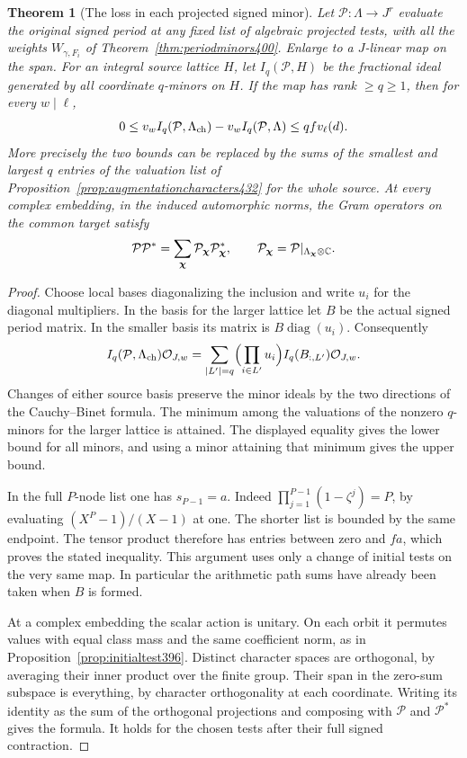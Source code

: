 \documentclass[a4paper,11pt]{article}
\newtheorem{theorem}[proposition]{Theorem}
\theoremstyle{definition}
\theoremstyle{remark}
\numberwithin{equation}{section}
\begin{document}
\begin{theorem}[The loss in each projected signed minor]\leavevmode
\label{thm:signedcharacterloss432}
Let \(\mathcal P:\Lambda\to J^r\) evaluate the original signed
period at any fixed list of algebraic projected tests, with all
the weights \(W_{\gamma,F_i}\) of
Theorem~\ref{thm:periodminors400}. Enlarge to a \(J\)-linear
map on the span. For an integral source lattice \(H\), let
\(I_q(\mathcal P,H)\) be the fractional ideal generated by
all coordinate \(q\)-minors on \(H\). If the map has rank
\(\ge q\ge1\), then for every \(w\mid\ell\),
\[
 0\le v_w I_q(\mathcal P,\Lambda_{\rm ch})
             -v_w I_q(\mathcal P,\Lambda)
                  \le q f v_\ell(d).
\]
More precisely the two bounds can be replaced by the sums of
the smallest and largest \(q\) entries of the valuation list
of Proposition~\ref{prop:augmentationcharacters432} for the
whole source. At every complex embedding, in the induced
automorphic norms, the Gram operators on the common target
satisfy
\[
       \mathcal P\mathcal P^*
        =\sum_{\boldsymbol\chi}
              \mathcal P_{\boldsymbol\chi}
                   \mathcal P_{\boldsymbol\chi}^* ,
       \qquad
       \mathcal P_{\boldsymbol\chi}
          =\mathcal P|_{\Lambda_{\boldsymbol\chi}\otimes\mathbb C}.
\]
\end{theorem}
\begin{proof}
Choose local bases diagonalizing the inclusion and write \(u_i\)
for the diagonal multipliers. In the basis for the larger lattice
let \(B\) be the actual signed period matrix. In the smaller
basis its matrix is \(B\operatorname{diag}(u_i)\).
Consequently
\[
 I_q(\mathcal P,\Lambda_{\rm ch})\mathcal O_{J,w}
   =\sum_{|L'|=q}\Bigl(\prod_{i\in L'}u_i\Bigr)
                      I_q(B_{:,L'})\mathcal O_{J,w}.
\]
Changes of either source basis preserve the minor ideals by
the two directions of the Cauchy--Binet formula. The minimum
among the valuations of the nonzero \(q\)-minors for the larger
lattice is attained. The displayed equality gives the lower
bound for all minors, and using a minor attaining that minimum
gives the upper bound.

In the full \(P\)-node list one has \(s_{P-1}=a\).
Indeed \(\prod_{j=1}^{P-1}(1-\zeta^j)=P\), by evaluating
\((X^P-1)/(X-1)\) at one. The shorter list is bounded by
the same endpoint. The tensor product therefore has entries
between zero and \(fa\), which proves the stated inequality.
This argument uses only a change of initial tests on the very
same map. In particular the arithmetic path sums have already
been taken when \(B\) is formed.

At a complex embedding the scalar action is unitary. On
each orbit it permutes values with equal class mass and
the same coefficient norm, as in
Proposition~\ref{prop:initialtest396}. Distinct character
spaces are orthogonal, by averaging their inner product over
the finite group. Their span in the zero-sum subspace is
everything, by character orthogonality at each coordinate.
Writing its identity as the sum of the orthogonal projections
and composing with \(\mathcal P\) and \(\mathcal P^*\) gives
the formula. It holds for the chosen tests after their full
signed contraction.
\end{proof}
\end{document}
